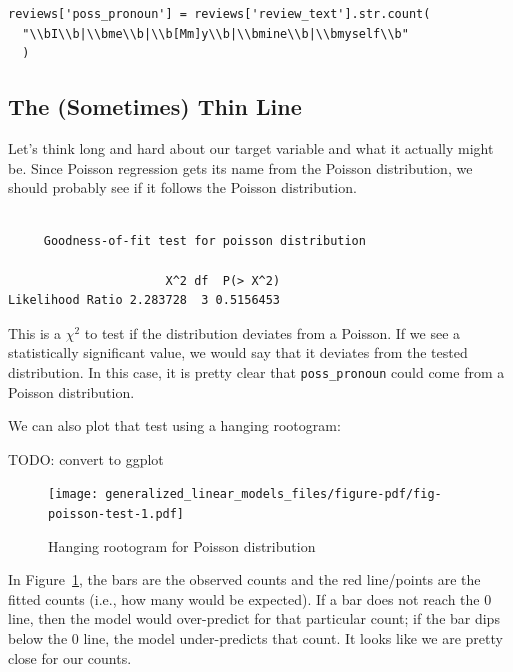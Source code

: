 \documentclass[
  letterpaper,
]{krantz}
\begin{document}
\begin{verbatim}
reviews['poss_pronoun'] = reviews['review_text'].str.count(
  "\\bI\\b|\\bme\\b|\\b[Mm]y\\b|\\bmine\\b|\\bmyself\\b"
  )
\end{verbatim}

\subsection{The (Sometimes) Thin Line}\label{sec-glm-thinline}

Let's think long and hard about our target variable and what it actually
might be. Since Poisson regression gets its name from the Poisson
distribution, we should probably see if it follows the Poisson
distribution.

\begin{verbatim}

     Goodness-of-fit test for poisson distribution

                      X^2 df  P(> X^2)
Likelihood Ratio 2.283728  3 0.5156453
\end{verbatim}

This is a \(\chi^2\) to test if the distribution deviates from a
Poisson. If we see a statistically significant value, we would say that
it deviates from the tested distribution. In this case, it is pretty
clear that \texttt{poss\_pronoun} could come from a Poisson
distribution.

We can also plot that test using a hanging rootogram:

TODO: convert to ggplot

\begin{figure}

{\centering \texttt{[image: generalized\_linear\_models\_files/figure-pdf/fig-poisson-test-1.pdf]}

}

\caption{\label{fig-poisson-test}Hanging rootogram for Poisson
distribution}

\end{figure}

In Figure~\ref{fig-poisson-test}, the bars are the observed counts and
the red line/points are the fitted counts (i.e., how many would be
expected). If a bar does not reach the 0 line, then the model would
over-predict for that particular count; if the bar dips below the 0
line, the model under-predicts that count. It looks like we are pretty
close for our counts.
\end{document}
